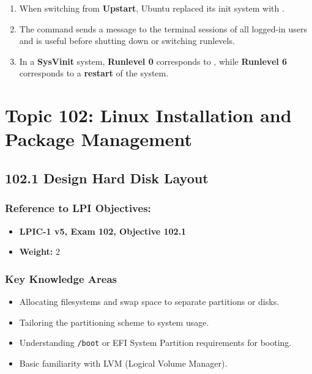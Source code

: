 \documentclass[12pt,a4paper]{report}
\begin{document}
\begin{enumerate}[1.]
\item When switching from \textbf{Upstart}, Ubuntu replaced its init system with \textbf{\underline{\hspace{2cm}}}.

\item The \textbf{\underline{\hspace{2cm}}} command sends a message to the terminal sessions of all logged-in users and is useful before shutting down or switching runlevels.

\item In a \textbf{SysVinit} system, \textbf{Runlevel 0} corresponds to \textbf{\underline{\hspace{2cm}}}, while \textbf{Runlevel 6} corresponds to a \textbf{restart} of the system.

\end{enumerate}

\chapter{Topic 102: Linux Installation and Package Management}

\newpage

\section*{102.1 Design Hard Disk Layout}


\subsection*{Reference to LPI Objectives:}
\begin{itemize}
    \item \textbf{LPIC-1 v5, Exam 102, Objective 102.1}
    \item \textbf{Weight:} 2
\end{itemize}

\subsection*{Key Knowledge Areas}
\begin{itemize}
    \item Allocating filesystems and swap space to separate partitions or disks.
    \item Tailoring the partitioning scheme to system usage.
    \item Understanding \texttt{/boot} or EFI System Partition requirements for booting.
    \item Basic familiarity with LVM (Logical Volume Manager).
\end{itemize}
\end{document}
